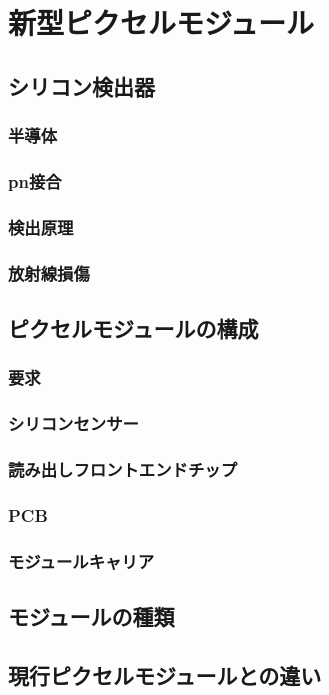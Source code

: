 \chapter{新型ピクセルモジュール}

\section{シリコン検出器}
\subsection{半導体}
\subsection{pn接合}
\subsection{検出原理}
\subsection{放射線損傷}

\section{ピクセルモジュールの構成}
\subsection{要求}
\subsection{シリコンセンサー}
\subsection{読み出しフロントエンドチップ}
\subsection{PCB}
\subsection{モジュールキャリア}

\section{モジュールの種類}



\section{現行ピクセルモジュールとの違い}
